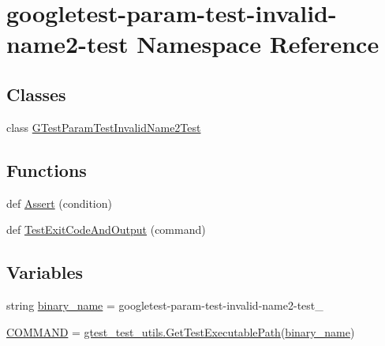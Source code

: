 \hypertarget{namespacegoogletest-param-test-invalid-name2-test}{}\section{googletest-\/param-\/test-\/invalid-\/name2-\/test Namespace Reference}
\label{namespacegoogletest-param-test-invalid-name2-test}
\subsection*{Classes}
\begin{DoxyCompactItemize}
\item 
class \mbox{\hyperlink{classgoogletest-param-test-invalid-name2-test_1_1GTestParamTestInvalidName2Test}{G\+Test\+Param\+Test\+Invalid\+Name2\+Test}}
\end{DoxyCompactItemize}
\subsection*{Functions}
\begin{DoxyCompactItemize}
\item 
def \mbox{\hyperlink{namespacegoogletest-param-test-invalid-name2-test_abce82484b5e340c0951436eab006fa2e}{Assert}} (condition)
\item 
def \mbox{\hyperlink{namespacegoogletest-param-test-invalid-name2-test_a6897220a9a1986dd4bbef1ca9f0629bd}{Test\+Exit\+Code\+And\+Output}} (command)
\end{DoxyCompactItemize}
\subsection*{Variables}
\begin{DoxyCompactItemize}
\item 
string \mbox{\hyperlink{namespacegoogletest-param-test-invalid-name2-test_a0e26891aaf72a6f04a60811b05a83e81}{binary\+\_\+name}} = \textquotesingle{}googletest-\/param-\/test-\/invalid-\/name2-\/test\+\_\+\textquotesingle{}
\item 
\mbox{\hyperlink{namespacegoogletest-param-test-invalid-name2-test_ac9395338e8bff8c30835e578658394e3}{C\+O\+M\+M\+A\+ND}} = \mbox{\hyperlink{namespacegtest__test__utils_a89ed3717984a80ffbb7a9c92f71b86a2}{gtest\+\_\+test\+\_\+utils.\+Get\+Test\+Executable\+Path}}(\mbox{\hyperlink{namespacegoogletest-param-test-invalid-name2-test_a0e26891aaf72a6f04a60811b05a83e81}{binary\+\_\+name}})
\end{DoxyCompactItemize}


